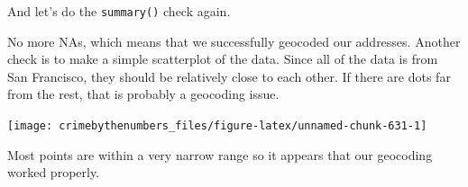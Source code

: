 \documentclass[
  a4paper,
]{krantz}
\makeatletter
\newenvironment{Shaded}{\begin{snugshade}}{\end{snugshade}}
\newcommand{\CommentTok}[1]{\textcolor[rgb]{0.37,0.37,0.37}{\textit{#1}}}
\newcommand{\FunctionTok}[1]{\textcolor[rgb]{0,0,0}{#1}}
\newcommand{\NormalTok}[1]{#1}
\newcommand{\SpecialCharTok}[1]{\textcolor[rgb]{0,0,0}{#1}}
\newenvironment{kframe}{%
\medskip{}
\setlength{\fboxsep}{.8em}
 \def\at@end@of@kframe{}%
 \ifinner\ifhmode%
  \def\at@end@of@kframe{\end{minipage}}%
  \begin{minipage}{\columnwidth}%
 \fi\fi%
 \def\FrameCommand##1{\hskip\@totalleftmargin \hskip-\fboxsep
 \colorbox{shadecolor}{##1}\hskip-\fboxsep
     \hskip-\linewidth \hskip-\@totalleftmargin \hskip\columnwidth}%
 \MakeFramed {\advance\hsize-\width
   \@totalleftmargin\z@ \linewidth\hsize
   \@setminipage}}%
 {\par\unskip\endMakeFramed%
 \at@end@of@kframe}
\renewenvironment{Shaded}{\begin{kframe}}{\end{kframe}}
\makeatother
\begin{document}
And let's do the \texttt{summary()} check again.

\begin{Shaded}
\end{Shaded}

\begin{Shaded}
\end{Shaded}

No more NAs, which means that we successfully geocoded our
addresses. Another check is to make a simple scatterplot of
the data. Since all of the data is from San Francisco, they
should be relatively close to each other. If there are dots
far from the rest, that is probably a geocoding issue.

\begin{Shaded}
\end{Shaded}

\begin{center}\texttt{[image: crimebythenumbers\_files/figure-latex/unnamed-chunk-631-1]} \end{center}

Most points are within a very narrow range so it appears
that our geocoding worked properly.

  

\backmatter
\printindex
\end{document}
